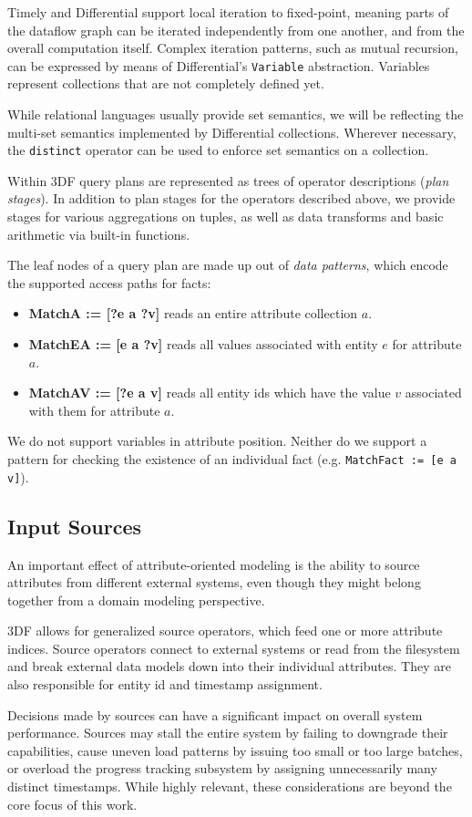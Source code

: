\documentclass[../index.tex]{subfiles}
\begin{document}
Timely and Differential support local iteration to fixed-point,
meaning parts of the dataflow graph can be iterated independently from
one another, and from the overall computation itself. Complex
iteration patterns, such as mutual recursion, can be expressed by
means of Differential's \texttt{Variable} abstraction. Variables
represent collections that are not completely defined yet.

While relational languages usually provide set semantics, we will be
reflecting the multi-set semantics implemented by Differential
collections. Wherever necessary, the \texttt{distinct} operator can be
used to enforce set semantics on a collection.

Within 3DF query plans are represented as trees of operator
descriptions (\emph{plan stages}). In addition to plan stages for the
operators described above, we provide stages for various aggregations
on tuples, as well as data transforms and basic arithmetic via
built-in functions.

The leaf nodes of a query plan are made up out of \emph{data
  patterns}, which encode the supported access paths for facts:

\begin{itemize}
\item \textbf{MatchA := [?e a ?v]} reads an entire attribute
  collection $a$.
\item \textbf{MatchEA := [e a ?v]} reads all values associated with
  entity $e$ for attribute $a$.
\item \textbf{MatchAV := [?e a v]} reads all entity ids which have the
  value $v$ associated with them for attribute $a$.
\end{itemize}

We do not support variables in attribute position. Neither do we
support a pattern for checking the existence of an individual fact
(e.g. \texttt{MatchFact := [e a v]}).

\subsection{Input Sources}

An important effect of attribute-oriented modeling is the ability to
source attributes from different external systems, even though they
might belong together from a domain modeling perspective.

3DF allows for generalized source operators, which feed one or more
attribute indices. Source operators connect to external systems or
read from the filesystem and break external data models down into
their individual attributes. They are also responsible for entity id
and timestamp assignment.

Decisions made by sources can have a significant impact on overall
system performance. Sources may stall the entire system by failing to
downgrade their capabilities, cause uneven load patterns by issuing
too small or too large batches, or overload the progress tracking
subsystem by assigning unnecessarily many distinct timestamps. While
highly relevant, these considerations are beyond the core focus of
this work.
\end{document}
